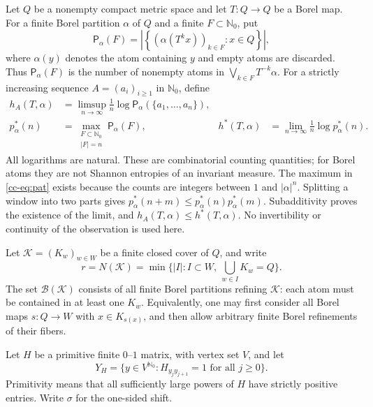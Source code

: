 \documentclass[11pt,reqno]{amsart}
\numberwithin{equation}{section}
\theoremstyle{definition}
\newcommand{\Nzero}{\mathbb N_0}
\newcommand{\Patt}{\mathsf P}
\newcommand{\hpat}{h^{*}}
\newcommand{\K}{\mathcal K}
\begin{document}
Let $Q$ be a nonempty compact metric space and let $T:Q\to Q$ be a Borel
map. For a finite Borel partition $\alpha$ of $Q$ and a finite
$F\subset\Nzero$, put
\[
 \Patt_\alpha(F)=
 \left|\left\{(\alpha(T^k x))_{k\in F}:x\in Q\right\}\right|,
\]
where $\alpha(y)$ denotes the atom containing $y$ and empty atoms are
discarded. Thus $\Patt_\alpha(F)$ is the number of nonempty atoms in
$\bigvee_{k\in F}T^{-k}\alpha$. For a strictly increasing sequence
$A=(a_i)_{i\ge1}$ in $\Nzero$, define
\begin{align}
 h_A(T,\alpha)&=\limsup_{n\to\infty}\frac1n
       \log\Patt_\alpha(\{a_1,\ldots,a_n\}),\label{cc-eq:seq}\\
 p_\alpha^*(n)&=\max_{\substack{F\subset\Nzero\\ |F|=n}}
                    \Patt_\alpha(F),
 &\hpat(T,\alpha)&=\lim_{n\to\infty}\frac1n\log p_\alpha^*(n).
 \label{cc-eq:pat}
\end{align}
All logarithms are natural. These are combinatorial counting quantities;
for Borel atoms they are not Shannon entropies of an invariant measure.
The maximum in \eqref{cc-eq:pat} exists because the counts are integers
between $1$ and $|\alpha|^n$. Splitting a window into two parts gives
$p_\alpha^*(n+m)\le p_\alpha^*(n)p_\alpha^*(m)$. Subadditivity proves the
existence of the limit, and $h_A(T,\alpha)\le\hpat(T,\alpha)$.
No invertibility or continuity of the observation is used here.

Let $\K=(K_w)_{w\in W}$ be a finite closed cover of $Q$, and write
\[
 r=N(\K)=\min\{|I|:I\subset W,\ \bigcup_{w\in I}K_w=Q\}.
\]
The set $\mathcal B(\K)$ consists of all finite Borel partitions refining
$\K$: each atom must be contained in at least one $K_w$. Equivalently,
one may first consider all Borel maps $s:Q\to W$ with $x\in K_{s(x)}$,
and then allow arbitrary finite Borel refinements of their fibers.

Let $H$ be a primitive finite $0$--$1$ matrix, with vertex set $V$, and
let
\[
 Y_H=\{y\in V^{\Nzero}:H_{y_jy_{j+1}}=1\text{ for all }j\ge0\}.
\]
Primitivity means that all sufficiently large powers of $H$ have strictly
positive entries. Write $\sigma$ for the one-sided shift.
\end{document}
